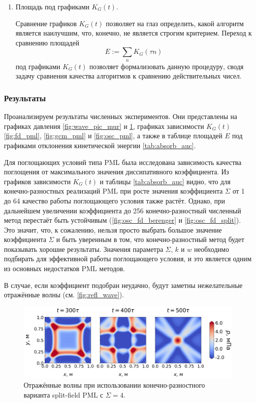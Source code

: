 \begin{enumerate}
    \item Площадь под графиками $K_G(t)$.
    
    Сравнение графиков $K_G(t)$ позволяет на глаз определить, какой алгоритм является наилучшим, что, конечно, не является строгим критерием. Переход к сравнению площадей
    \begin{equation}
        E := \sum_{n} K_G(\tau n)
        \label{eq:auc}
    \end{equation} 
    под графиками  $K_G(t)$ позволяет формализовать данную процедуру, сводя задачу сравнения качества алгоритмов к сравнению действительных чисел.
\end{enumerate}

\subsubsection{Результаты}

Проанализируем результаты численных экспериментов. Они представлены на графиках давления \ref{fig:wave_pic_mur} и \ref{fig:refl_wave}, графиках зависимости $K_G(t)$ \ref{fig:fd_pml}, \ref{fig:gcm_pml} и \ref{fig:osc_pml}, а также в таблице площадей $E$ под графиками отклонения  кинетической энергии \autoref{tab:absorb_auc}.

Для поглощающих условий типа PML была исследована зависимость качества поглощения от максимального значения диссипативного коэффициента. Из графиков зависимости $K_G(t)$ и таблицы \ref{tab:absorb_auc} видно, что для конечно-разностных реализаций PML при росте значения коэффициента $\Sigma$ от 1 до 64 качество работы поглощающего условия также растёт. Однако, при дальнейшем увеличении коэффициента до 256 конечно-разностный численный метод перестаёт быть устойчивым (\autoref{fig:osc_fd_berenger} и \autoref{fig:osc_fd_split}). Это значит, что, к сожалению, нельзя просто выбрать большое значение коэффициента $\Sigma$ и быть уверенным в том, что конечно-разностный метод будет показывать хорошие результаты. Значения параметра $\Sigma$, $k$ и $w$ необходимо подбирать для эффективной работы поглощающего условия, и это является одним из основных недостатков PML методов.

В случае, если коэффициент подобран неудачно, будут заметны нежелательные отражённые волны (см. \autoref{fig:refl_wave}).

\begin{figure}[H]
    \centering
    \includegraphics[width=1.0\textwidth]{images/pml/wave_pic_fd_split_pml_1.png}
    \caption{Отражённые волны при использовании конечно-разностного варианта split-field PML с $\Sigma=4$.}
    \label{fig:refl_wave}
\end{figure}

